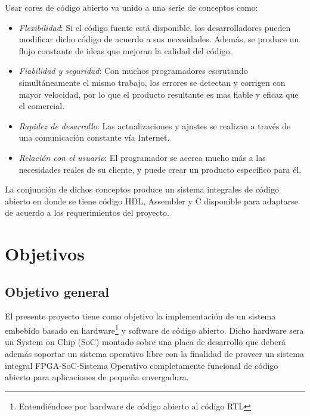 Usar cores de código abierto va unido a una serie de conceptos como:
\begin{itemize}
\item \textit{Flexibilidad}: Si el código fuente está disponible, los
  desarrolladores pueden modificar dicho código de acuerdo a sus
  necesidades. Además, se produce un flujo constante de ideas que
  mejoran la calidad del código.
\item \textit{Fiabilidad y seguridad}: Con muchos programadores
  escrutando simultáneamente el mismo trabajo, los errores se detectan
  y corrigen con mayor velocidad, por lo que el producto resultante es
  mas fiable y eficaz que el comercial.
\item \textit{Rapidez de desarrollo}: Las actualizaciones y ajustes se
  realizan a través de una comunicación constante vía Internet.
\item \textit{Relación con el usuario}: El programador se acerca mucho
  más a las necesidades reales de su cliente, y puede crear un
  producto específico para él.
\end{itemize}

La conjunción de dichos conceptos produce un sistema integrales de
código abierto en donde se tiene código HDL, Assembler y C disponible
para adaptarse de acuerdo a los requerimientos del proyecto.


\section{Objetivos}
\subsection{Objetivo general}
El presente proyecto tiene como objetivo la implementación de un sistema embebido basado en hardware\footnote{Entendiéndose por hardware de código abierto al código RTL} y software de código abierto.
Dicho hardware sera un System on Chip (SoC) montado sobre una placa de desarrollo que deberá además soportar un sistema operativo
libre con la finalidad de proveer un sistema integral FPGA-SoC-Sistema
Operativo completamente funcional de código abierto para aplicaciones de pequeña envergadura.


